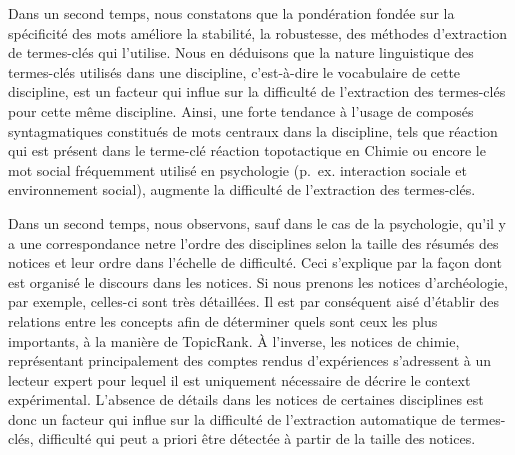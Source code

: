   Dans un second temps, nous constatons que la pondération fondée sur la
  spécificité des mots améliore la stabilité, la robustesse, des méthodes
  d'extraction de termes-clés qui l'utilise. Nous en déduisons que la nature
  linguistique des termes-clés utilisés dans une discipline, c'est-à-dire le
  vocabulaire de cette discipline, est un facteur qui influe sur la difficulté
  de l'extraction des termes-clés pour cette même discipline. Ainsi, une forte
  tendance à l'usage de composés syntagmatiques constitués de mots centraux dans
  la discipline, tels que \og{}réaction\fg{} qui est présent dans le terme-clé
  \og{}réaction topotactique\fg{} en Chimie ou encore le mot \og{}social\fg{}
  fréquemment utilisé en psychologie (p.~ex. \og{}interaction sociale\fg{} et
  \og{}environnement social\fg{}), augmente la difficulté de l'extraction des
  termes-clés.

  Dans un second temps, nous observons, sauf dans le cas de la psychologie,
  qu'il y a une correspondance netre l'ordre des disciplines selon la taille des
  résumés des notices et leur ordre dans l'échelle de difficulté. Ceci
  s'explique par la façon dont est organisé le discours dans les notices. Si
  nous prenons les notices d'archéologie, par exemple, celles-ci sont très
  détaillées. Il est par conséquent aisé d'établir des relations entre les
  concepts afin de déterminer quels sont ceux les plus importants, à la manière
  de TopicRank. À l'inverse, les notices de chimie, représentant principalement
  des comptes rendus d'expériences s'adressent à un lecteur expert pour lequel
  il est uniquement nécessaire de décrire le context expérimental. L'absence de
  détails dans les notices de certaines disciplines est donc un facteur qui
  influe sur la difficulté de l'extraction automatique de termes-clés,
  difficulté qui peut a priori être détectée à partir de la taille des notices.

